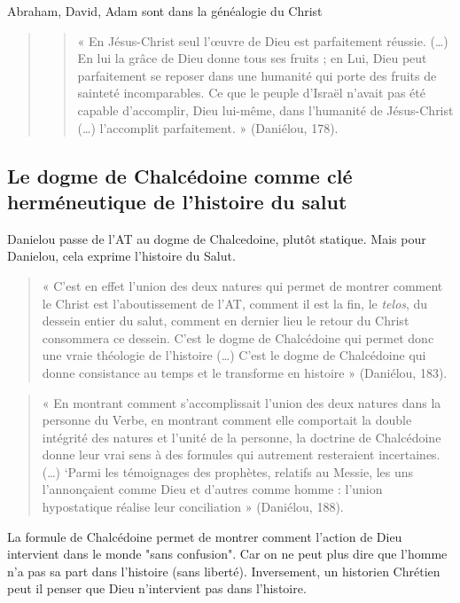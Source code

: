 Abraham, David, Adam sont dans la généalogie du Christ
\begin{quote}
    
\begin{quote}
    « En Jésus-Christ seul l’œuvre de Dieu est parfaitement réussie.  (…) En lui la grâce de Dieu donne tous ses fruits ; en Lui, Dieu peut parfaitement se reposer dans une humanité qui porte des fruits de sainteté incomparables. Ce que le peuple d’Israël n’avait pas été capable d’accomplir, Dieu lui-même, dans l’humanité de Jésus-Christ (…) l’accomplit parfaitement. » (Daniélou, 178). 
\end{quote}
\end{quote}

\subsection{Le dogme de Chalcédoine comme clé herméneutique de l’histoire du salut }

Danielou passe de l'AT au dogme de Chalcedoine, plutôt statique. Mais pour Danielou, cela exprime l'histoire du Salut.


\begin{quote}
    « C’est en effet l’union des deux natures qui permet de montrer comment le Christ est l’aboutissement de l’AT, comment il est la fin, le \textit{telos}, du dessein entier du salut, comment en dernier lieu le retour du Christ consommera  ce dessein. C’est le dogme de Chalcédoine qui permet donc une vraie théologie de l’histoire (…) C’est le dogme de Chalcédoine qui donne consistance au temps et le transforme en histoire » (Daniélou, 183). 
\end{quote}

\begin{quote}
    « En montrant comment s’accomplissait l’union des deux natures dans la personne du Verbe, en montrant comment elle comportait la double intégrité des natures et l’unité de la personne, la doctrine de Chalcédoine donne leur vrai sens à des formules qui autrement resteraient incertaines. (…) ‘Parmi les témoignages des prophètes, relatifs au Messie, les uns l’annonçaient comme Dieu et d’autres comme homme : l’union hypostatique réalise leur conciliation » (Daniélou,  188). 
\end{quote}

La formule de Chalcédoine permet de montrer comment l'action de Dieu intervient dans le monde "sans confusion". Car on ne peut plus dire que l'homme n'a pas sa part dans l'histoire (sans liberté). Inversement, un historien Chrétien peut il penser que Dieu n'intervient pas dans l'histoire.


